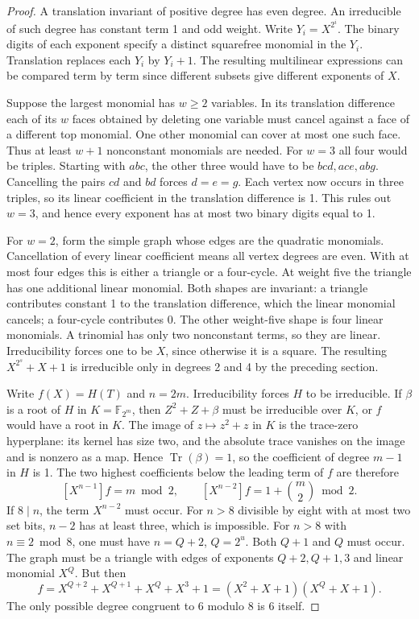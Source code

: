 \documentclass[11pt]{article}
\begin{document}
\begin{proof}
A translation invariant of positive degree has even degree. An
irreducible of such degree has constant term 1 and odd weight.
Write \(Y_i=X^{2^i}\). The binary digits of each exponent specify a
distinct squarefree monomial in the \(Y_i\). Translation replaces
each \(Y_i\) by \(Y_i+1\). The resulting multilinear expressions
can be compared term by term since different subsets give different
exponents of \(X\).

Suppose the largest monomial has \(w\ge2\) variables. In its
translation difference each of its \(w\) faces obtained by deleting
one variable must cancel against a face of a different top monomial.
One other monomial can cover at most one such face. Thus at least
\(w+1\) nonconstant monomials are needed. For \(w=3\) all four
would be triples. Starting with \(abc\), the other three would have
to be \(bcd,ace,abg\). Cancelling the pairs \(cd\) and \(bd\)
forces \(d=e=g\). Each vertex now occurs in three triples, so its
linear coefficient in the translation difference is 1. This rules
out \(w=3\), and hence every exponent has at most two binary digits
equal to 1.

For \(w=2\), form the simple graph whose edges are the quadratic
monomials. Cancellation of every linear coefficient means all vertex
degrees are even. With at most four edges this is either a triangle
or a four-cycle. At weight five the triangle has one additional
linear monomial. Both shapes are invariant: a triangle contributes
constant 1 to the translation difference, which the linear monomial
cancels; a four-cycle contributes 0. The other weight-five shape is
four linear monomials. A trinomial has only two nonconstant terms,
so they are linear. Irreducibility forces one to be \(X\), since
otherwise it is a square. The resulting \(X^{2^s}+X+1\) is
irreducible only in degrees 2 and 4 by the preceding section.

Write \(f(X)=H(T)\) and \(n=2m\). Irreducibility forces \(H\) to
be irreducible. If \(\beta\) is a root of \(H\) in
\(K=\mathbb F_{2^m}\), then \(Z^2+Z+\beta\) must be irreducible
over \(K\), or \(f\) would have a root in \(K\). The image of
\(z\mapsto z^2+z\) in \(K\) is the trace-zero hyperplane: its
kernel has size two, and the absolute trace vanishes on the image
and is nonzero as a map. Hence \(\operatorname{Tr}(\beta)=1\), so
the coefficient of degree \(m-1\) in \(H\) is 1. The two highest
coefficients below the leading term of \(f\) are therefore
\[
       [X^{n-1}]f=m\bmod2,\qquad
       [X^{n-2}]f=1+\binom m2\bmod2.
\]
If \(8\mid n\), the term \(X^{n-2}\) must occur. For \(n>8\)
divisible by eight with at most two set bits, \(n-2\) has at least
three, which is impossible. For \(n>8\) with \(n\equiv2\bmod8\),
one must have \(n=Q+2\), \(Q=2^u\). Both \(Q+1\) and \(Q\) must
occur. The graph must be a triangle with edges of exponents
\(Q+2,Q+1,3\) and linear monomial \(X^Q\). But then
\[
 f=X^{Q+2}+X^{Q+1}+X^Q+X^3+1=(X^2+X+1)(X^Q+X+1).
\]
The only possible degree congruent to 6 modulo 8 is 6 itself.


\end{proof}
\end{document}
